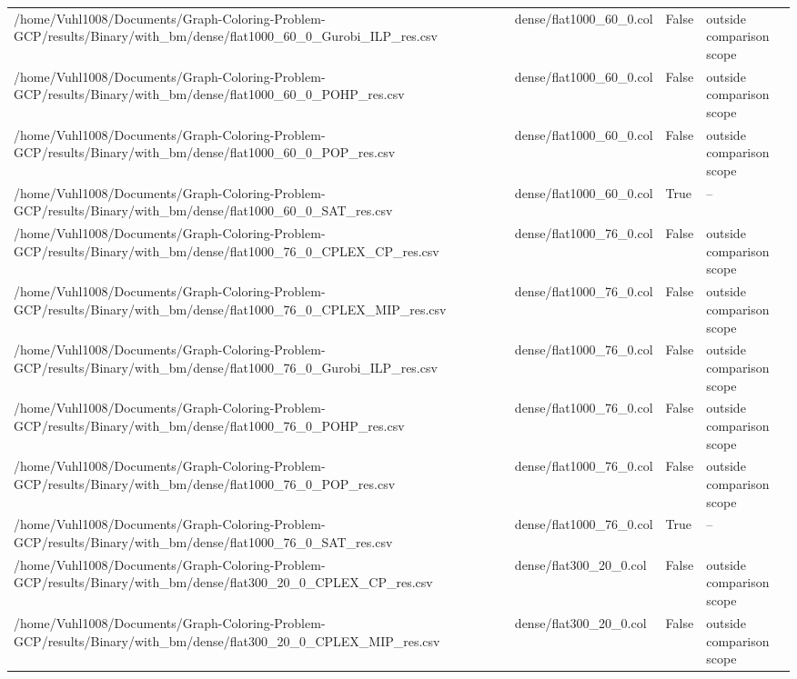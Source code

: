 \begin{table}[htbp]
\begin{tabular}{llll}
/home/Vuhl1008/Documents/Graph-Coloring-Problem-GCP/results/Binary/with\_bm/dense/flat1000\_60\_0\_Gurobi\_ILP\_res.csv & dense/flat1000\_60\_0.col & False & outside comparison scope \\
/home/Vuhl1008/Documents/Graph-Coloring-Problem-GCP/results/Binary/with\_bm/dense/flat1000\_60\_0\_POHP\_res.csv & dense/flat1000\_60\_0.col & False & outside comparison scope \\
/home/Vuhl1008/Documents/Graph-Coloring-Problem-GCP/results/Binary/with\_bm/dense/flat1000\_60\_0\_POP\_res.csv & dense/flat1000\_60\_0.col & False & outside comparison scope \\
/home/Vuhl1008/Documents/Graph-Coloring-Problem-GCP/results/Binary/with\_bm/dense/flat1000\_60\_0\_SAT\_res.csv & dense/flat1000\_60\_0.col & True & -- \\
/home/Vuhl1008/Documents/Graph-Coloring-Problem-GCP/results/Binary/with\_bm/dense/flat1000\_76\_0\_CPLEX\_CP\_res.csv & dense/flat1000\_76\_0.col & False & outside comparison scope \\
/home/Vuhl1008/Documents/Graph-Coloring-Problem-GCP/results/Binary/with\_bm/dense/flat1000\_76\_0\_CPLEX\_MIP\_res.csv & dense/flat1000\_76\_0.col & False & outside comparison scope \\
/home/Vuhl1008/Documents/Graph-Coloring-Problem-GCP/results/Binary/with\_bm/dense/flat1000\_76\_0\_Gurobi\_ILP\_res.csv & dense/flat1000\_76\_0.col & False & outside comparison scope \\
/home/Vuhl1008/Documents/Graph-Coloring-Problem-GCP/results/Binary/with\_bm/dense/flat1000\_76\_0\_POHP\_res.csv & dense/flat1000\_76\_0.col & False & outside comparison scope \\
/home/Vuhl1008/Documents/Graph-Coloring-Problem-GCP/results/Binary/with\_bm/dense/flat1000\_76\_0\_POP\_res.csv & dense/flat1000\_76\_0.col & False & outside comparison scope \\
/home/Vuhl1008/Documents/Graph-Coloring-Problem-GCP/results/Binary/with\_bm/dense/flat1000\_76\_0\_SAT\_res.csv & dense/flat1000\_76\_0.col & True & -- \\
/home/Vuhl1008/Documents/Graph-Coloring-Problem-GCP/results/Binary/with\_bm/dense/flat300\_20\_0\_CPLEX\_CP\_res.csv & dense/flat300\_20\_0.col & False & outside comparison scope \\
/home/Vuhl1008/Documents/Graph-Coloring-Problem-GCP/results/Binary/with\_bm/dense/flat300\_20\_0\_CPLEX\_MIP\_res.csv & dense/flat300\_20\_0.col & False & outside comparison scope \\

\end{tabular}
\end{table}
